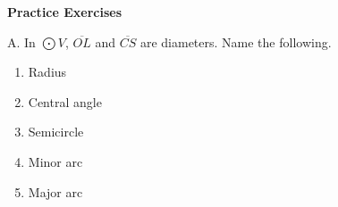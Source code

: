 \textbf{Practice Exercises}

\vspce

A. In $\bigodot V$, $\overline{OL} $ and $\overline{CS} $ are diameters. Name the following.  
\begin{enumerate}[label = \arabic*. ]  
\item \hspce Radius 
\item \hspce Central angle
\item \hspce Semicircle \hspace*{4cm}  
\item \hspce Minor arc
\item \hspce Major arc
\end{enumerate}  

% 